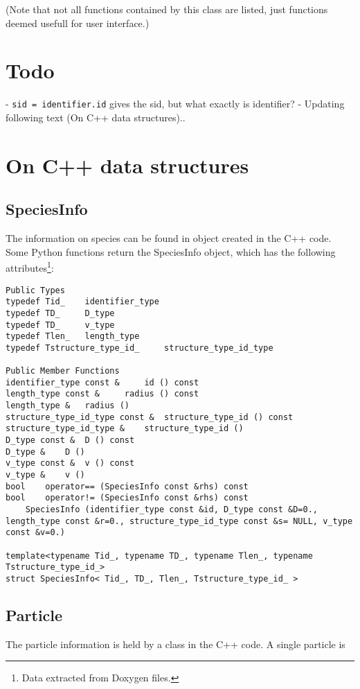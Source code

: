 \documentclass[a4paper,10pt]{article}
\begin{document}
(Note that not all functions contained by this class are listed, just functions deemed usefull for user interface.)

\section{Todo}

- \texttt{sid = identifier.id} gives the sid, but what exactly is identifier?
- Updating following text (On C++ data structures)..

\section{On C++ data structures}

\subsection{SpeciesInfo}

The information on species can be found in object created in the C++ code. Some Python functions return the SpeciesInfo object, which has the following attributes\footnote{Data extracted from Doxygen files.}:

\begin{verbatim}
Public Types
typedef Tid_ 	identifier_type
typedef TD_ 	D_type
typedef TD_ 	v_type
typedef Tlen_ 	length_type
typedef Tstructure_type_id_ 	structure_type_id_type

Public Member Functions
identifier_type const & 	id () const
length_type const & 	radius () const
length_type & 	radius ()
structure_type_id_type const & 	structure_type_id () const
structure_type_id_type & 	structure_type_id ()
D_type const & 	D () const
D_type & 	D ()
v_type const & 	v () const
v_type & 	v ()
bool 	operator== (SpeciesInfo const &rhs) const
bool 	operator!= (SpeciesInfo const &rhs) const
 	SpeciesInfo (identifier_type const &id, D_type const &D=0., length_type const &r=0., structure_type_id_type const &s= NULL, v_type const &v=0.)

template<typename Tid_, typename TD_, typename Tlen_, typename Tstructure_type_id_>
struct SpeciesInfo< Tid_, TD_, Tlen_, Tstructure_type_id_ >
\end{verbatim}

\subsection{Particle}

The particle information is held by a class in the C++ code. A single particle is 
\end{document}

